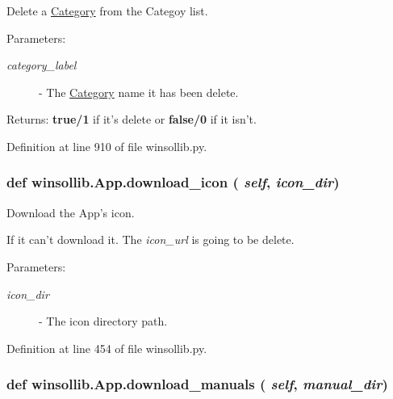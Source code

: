 Delete a \hyperlink{classwinsollib_1_1Category}{Category} from the Categoy list. 

\begin{Desc}
\item[Parameters:]
\begin{description}
\item[{\em category\_\-label}]- The \hyperlink{classwinsollib_1_1Category}{Category} name it has been delete. \end{description}
\end{Desc}
\begin{Desc}
\item[Returns:]{\bf true/1} if it's delete or {\bf false/0} if it isn't. \end{Desc}


Definition at line 910 of file winsollib.py.\hypertarget{classwinsollib_1_1App_d03267022a1b50182e48afd7da8406a6}{
\subsubsection[download\_\-icon]{\setlength{\rightskip}{0pt plus 5cm}def winsollib.App.download\_\-icon ( {\em self},  {\em icon\_\-dir})}}
\label{classwinsollib_1_1App_d03267022a1b50182e48afd7da8406a6}


Download the App's icon. 

If it can't download it. The {\em icon\_\-url\/} is going to be delete. \begin{Desc}
\item[Parameters:]
\begin{description}
\item[{\em icon\_\-dir}]- The icon directory path. \end{description}
\end{Desc}


Definition at line 454 of file winsollib.py.\hypertarget{classwinsollib_1_1App_d145c233b265221b3dc00d37cbf09667}{
\subsubsection[download\_\-manuals]{\setlength{\rightskip}{0pt plus 5cm}def winsollib.App.download\_\-manuals ( {\em self},  {\em manual\_\-dir})}}
\label{classwinsollib_1_1App_d145c233b265221b3dc00d37cbf09667}


